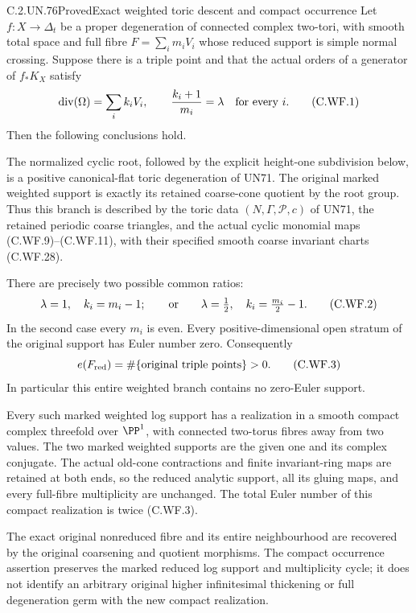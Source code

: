 \begin{statement}{C.2.UN.76}{Proved}{Exact weighted toric descent and compact occurrence}
Let \(f:X\to\Delta_t\) be a proper degeneration of connected complex
two-tori, with smooth total space and full fibre
\(F=\sum_i m_iV_i\) whose reduced support is simple normal crossing.
Suppose there is a triple point and that the actual orders of a
generator of \(f_*K_X\) satisfy
\[
 \operatorname{div}(\Omega)=\sum_i k_iV_i,\qquad
 \frac{k_i+1}{m_i}=\lambda\quad\hbox{for every }i.
\tag{C.WF.1}
\]
Then the following conclusions hold.

The normalized cyclic root, followed by the explicit height-one
subdivision below, is a positive canonical-flat toric degeneration
of UN71.  The original marked weighted support is exactly its
retained coarse-cone quotient by the root group.  Thus this branch
is described by the toric data \((N,\Gamma,\mathscr P,c)\) of UN71,
the retained periodic coarse triangles, and the actual cyclic
monomial maps (C.WF.9)--(C.WF.11), with their specified smooth
coarse invariant charts (C.WF.28).

There are precisely two possible common ratios:
\[
 \lambda=1,\quad k_i=m_i-1;
 \qquad\hbox{or}\qquad
 \lambda=\tfrac12,\quad k_i=\tfrac{m_i}{2}-1.
\tag{C.WF.2}
\]
In the second case every \(m_i\) is even.  Every positive-dimensional
open stratum of the original support has Euler number zero.
Consequently
\[
             e(F_{\mathrm{red}})
               =\#\{\hbox{original triple points}\}>0.
\tag{C.WF.3}
\]
In particular this entire weighted branch contains no zero-Euler
support.

Every such marked weighted log support has a realization in a
smooth compact complex threefold over \(\PP^1\), with connected
two-torus fibres away from two values.  The two marked weighted
supports are the given one and its complex conjugate.  The actual
old-cone contractions and finite invariant-ring maps are retained
at both ends, so the reduced analytic support, all its gluing maps,
and every full-fibre multiplicity are unchanged.  The total Euler
number of this compact realization is twice (C.WF.3).

The exact original nonreduced fibre and its entire neighbourhood
are recovered by the original coarsening and quotient morphisms.
The compact occurrence assertion preserves the marked reduced
log support and multiplicity cycle; it does not identify an
arbitrary original higher infinitesimal thickening or full
degeneration germ with the new compact realization.
\end{statement}

